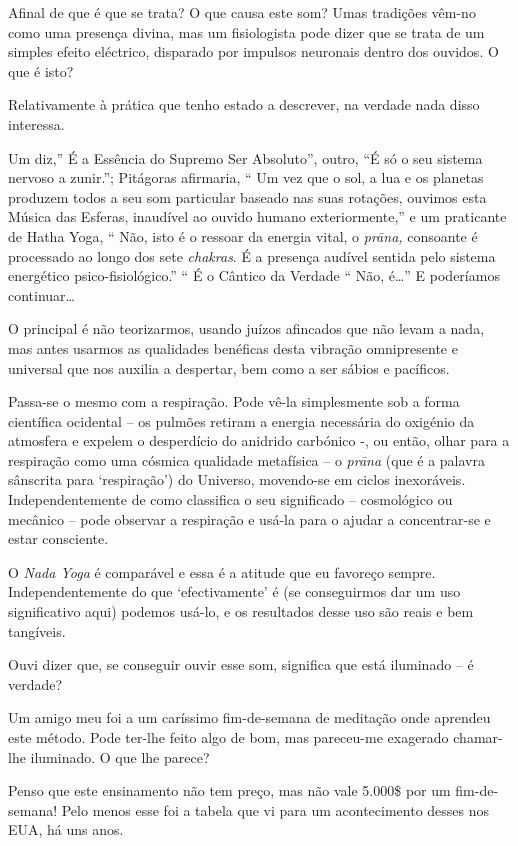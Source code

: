  Afinal de que é que se trata? O que causa este som? Umas tradições
vêm-no como uma presença divina, mas um fisiologista pode dizer que se
trata de um simples efeito eléctrico, disparado por impulsos neuronais
dentro dos ouvidos. O que é isto?

 Relativamente à prática que tenho estado a descrever, na verdade nada
disso interessa.

Um diz,'' É a Essência do Supremo Ser Absoluto'', outro, ``É só o seu
sistema nervoso a zunir.''; Pitágoras afirmaria, `` Um vez que o sol, a
lua e os planetas produzem todos a seu som particular baseado nas suas
rotações, ouvimos esta Música das Esferas, inaudível ao ouvido humano
exteriormente,'' e um praticante de Hatha Yoga, `` Não, isto é o ressoar
da energia vital, o \emph{prāna,} consoante é processado ao longo dos
sete \emph{chakras}. É a presença audível sentida pelo sistema
energético psico-fisiológico.'' `` É o Cântico da Verdade `` Não,
é\ldots{}'' E poderíamos continuar\ldots{}

O principal é não teorizarmos, usando juízos afincados que não levam a
nada, mas antes usarmos as qualidades benéficas desta vibração
omnipresente e universal que nos auxilia a despertar, bem como a ser
sábios e pacíficos.

Passa-se o mesmo com a respiração. Pode vê-la simplesmente sob a forma
científica ocidental -- os pulmões retiram a energia necessária do
oxigénio da atmosfera e expelem o desperdício do anidrido carbónico -,
ou então, olhar para a respiração como uma cósmica qualidade metafísica
-- o \emph{prāna} (que é a palavra sânscrita para `respiração') do
Universo, movendo-se em ciclos inexoráveis. Independentemente de como
classifica o seu significado -- cosmológico ou mecânico -- pode observar
a respiração e usá-la para o ajudar a concentrar-se e estar consciente.

O \emph{Nada Yoga} é comparável e essa é a atitude que eu favoreço
sempre. Independentemente do que `efectivamente' é (se conseguirmos dar
um uso significativo aqui) podemos usá-lo, e os resultados desse uso são
reais e bem tangíveis.

 Ouvi dizer que, se conseguir ouvir esse som, significa que está
iluminado -- é verdade?

Um amigo meu foi a um caríssimo fim-de-semana de meditação onde aprendeu
este método. Pode ter-lhe feito algo de bom, mas pareceu-me exagerado
chamar-lhe iluminado. O que lhe parece?

 Penso que este ensinamento não tem preço, mas não vale 5.000\$ por um
fim-de-semana! Pelo menos esse foi a tabela que vi para um acontecimento
desses nos EUA, há uns anos.


